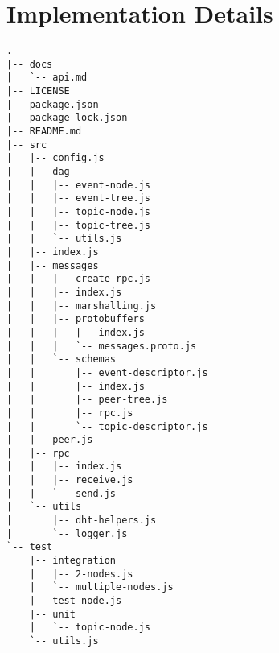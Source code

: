 
\chapter{Implementation Details}
\label{appendix:implementation}

\begin{lstlisting}[float, caption={File tree for our Pulsarcast implementation},label={file-tree}]
.
|-- docs
|   `-- api.md
|-- LICENSE
|-- package.json
|-- package-lock.json
|-- README.md
|-- src
|   |-- config.js
|   |-- dag
|   |   |-- event-node.js
|   |   |-- event-tree.js
|   |   |-- topic-node.js
|   |   |-- topic-tree.js
|   |   `-- utils.js
|   |-- index.js
|   |-- messages
|   |   |-- create-rpc.js
|   |   |-- index.js
|   |   |-- marshalling.js
|   |   |-- protobuffers
|   |   |   |-- index.js
|   |   |   `-- messages.proto.js
|   |   `-- schemas
|   |       |-- event-descriptor.js
|   |       |-- index.js
|   |       |-- peer-tree.js
|   |       |-- rpc.js
|   |       `-- topic-descriptor.js
|   |-- peer.js
|   |-- rpc
|   |   |-- index.js
|   |   |-- receive.js
|   |   `-- send.js
|   `-- utils
|       |-- dht-helpers.js
|       `-- logger.js
`-- test
    |-- integration
    |   |-- 2-nodes.js
    |   `-- multiple-nodes.js
    |-- test-node.js
    |-- unit
    |   `-- topic-node.js
    `-- utils.js
\end{lstlisting}

